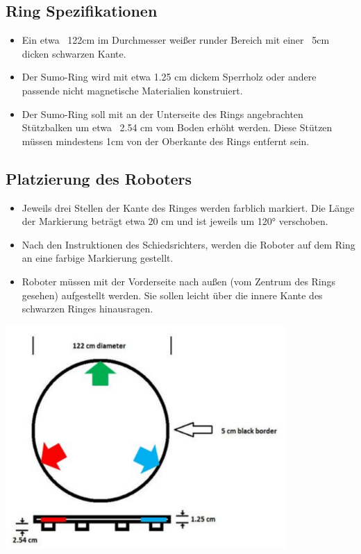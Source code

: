 \documentclass[a4paper,12pt]{article}
\begin{document}
\subsection{Ring Spezifikationen}
\begin{itemize}
	\item Ein etwa ~122cm im Durchmesser weißer runder Bereich mit einer ~5cm dicken schwarzen Kante.
	\item Der Sumo-Ring wird mit etwa 1.25 cm dickem Sperrholz oder andere passende nicht magnetische Materialien konstruiert.
	\item Der Sumo-Ring soll mit an der Unterseite des Rings angebrachten Stützbalken um etwa ~2.54 cm vom Boden erhöht werden. Diese Stützen müssen mindestens 1cm von der Oberkante des Rings entfernt sein. %
\end{itemize}

\subsection{Platzierung des Roboters}
\begin{itemize}
	\item Jeweils drei Stellen der Kante des Ringes werden farblich markiert. Die Länge der Markierung beträgt etwa 20 cm und ist jeweils um 120° verschoben.
	\item Nach den Instruktionen des Schiedsrichters, werden die Roboter auf dem Ring an eine farbige Markierung gestellt.
	\item Roboter müssen mit der Vorderseite nach außen (vom Zentrum des Rings gesehen) aufgestellt werden. Sie sollen leicht über die innere Kante des schwarzen Ringes hinausragen.
\end{itemize}

\includegraphics[width=0.8\textwidth]{sumo_bot_ring.png}
\end{document}
